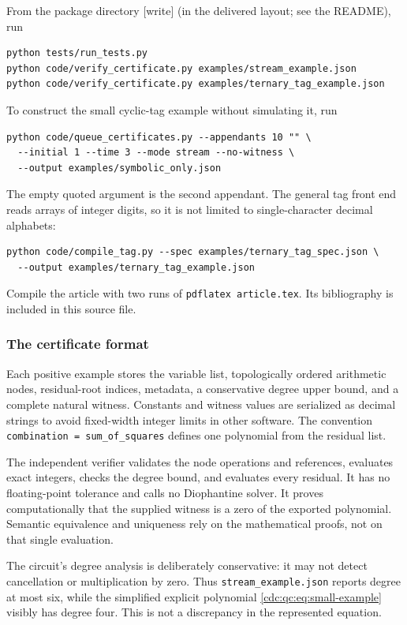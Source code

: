 \documentclass[11pt,a4paper]{article}
\theoremstyle{definition}
\theoremstyle{remark}
\newcommand{\wtag}{\textup{[write]}}%
\begin{document}
From the package directory \wtag{} (in the delivered layout; see the README), run
\begin{verbatim}
python tests/run_tests.py
python code/verify_certificate.py examples/stream_example.json
python code/verify_certificate.py examples/ternary_tag_example.json
\end{verbatim}
To construct the small cyclic-tag example without simulating it, run
\begin{verbatim}
python code/queue_certificates.py --appendants 10 "" \
  --initial 1 --time 3 --mode stream --no-witness \
  --output examples/symbolic_only.json
\end{verbatim}
The empty quoted argument is the second appendant. The general tag front end reads arrays of integer digits, so it is not limited to single-character decimal alphabets:
\begin{verbatim}
python code/compile_tag.py --spec examples/ternary_tag_spec.json \
  --output examples/ternary_tag_example.json
\end{verbatim}
Compile the article with two runs of \texttt{pdflatex article.tex}. Its bibliography is included in this source file.

\subsubsection{The certificate format}
Each positive example stores the variable list, topologically ordered arithmetic nodes, residual-root indices, metadata, a conservative degree upper bound, and a complete natural witness. Constants and witness values are serialized as decimal strings to avoid fixed-width integer limits in other software. The convention \texttt{combination = sum\_of\_squares} defines one polynomial from the residual list.

The independent verifier validates the node operations and references, evaluates exact integers, checks the degree bound, and evaluates every residual. It has no floating-point tolerance and calls no Diophantine solver. It proves computationally that the supplied witness is a zero of the exported polynomial. Semantic equivalence and uniqueness rely on the mathematical proofs, not on that single evaluation.

The circuit's degree analysis is deliberately conservative: it may not detect cancellation or multiplication by zero. Thus \texttt{stream\_example.json} reports degree at most six, while the simplified explicit polynomial \eqref{cdc:qc:eq:small-example} visibly has degree four. This is not a discrepancy in the represented equation.
\end{document}
